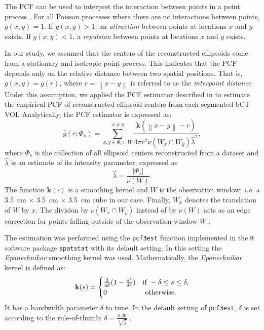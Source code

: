 \documentclass[journal]{IEEEtran}
\newcommand{\norm}[1]{\left\lVert#1\right\rVert}%
\begin{document}
The PCF can be used to interpret the interaction between points in a
point process \cite{illian2008statistical}. For all Poisson processes
where there are no interactions between points, $g(x,y)=1$. If
$g(x,y)>1$, an \textit{attraction} between points at locations $x$ and
$y$ exists. If $g(x,y)<1$, a \textit{repulsion} between points at
locations $x$ and $y$ exists.

In our study, we assumed that the centers of the reconstructed
ellipsoids come from a stationary and isotropic point process. This
indicates that the PCF depends only on the relative distance between
two spatial positions. That is, $g(x, y) = g(r)$, where
$r = \norm{x-y}$ is referred to as the \textit{interpoint
  distance}. Under this assumption, we applied the PCF estimator
described in \cite[p232]{illian2008statistical} to estimate the
empirical PCF of reconstructed ellipsoid centers from each segmented
bCT VOI. Analytically, the PCF estimator is expressed as:
\begin{equation}
  \label{eq:pcf-estimator}
  \hat{g}(r; \Phi_s) = \sum^{x \neq y}_{x, y \in \Phi_s \cap W}
  \frac{\mathbf{k}(\norm{x-y} - r)}
  {4 \pi r^2 \nu(W_x \cap W_y) \hat{\lambda}^2},
\end{equation}
where $\Phi_s$ is the collection of all ellipsoid centers
reconstructed from a dataset and $\hat{\lambda}$ is an estimate of its
intensity parameter, expressed as
\begin{equation}
  \label{eq:inten-estimtor}
  \hat{\lambda} = \frac{|\Phi_s|}{\nu(W)}.
\end{equation}
The function $\mathbf{k}(\cdot)$ is a smoothing kernel and $W$ is the
observation window; \textit{i.e.} a \SI{3.5}{\cm} $\times$
\SI{3.5}{\cm} $\times$ \SI{3.5}{\cm} cube in our case. Finally, $W_x$
denotes the translation of $W$ by $x$. The division by
$\nu(W_x \cap W_y)$ instead of by $\nu(W)$ acts as an edge correction
for points falling outside of the observation window $W$
\cite{ohser1983estimators}.

The estimation was performed using the \texttt{pcf3est} function
implemented in the \texttt{R} software package \texttt{spatstat}
\cite{baddeley2005spatstat} with its default setting. In this setting
the \textit{Epanechnikov} smoothing kernel \cite{chiu2013stochastic}
was used. Mathematically, the \textit{Epanechnikov} kernel is defined
as:
\begin{equation}
  \label{eq:epan-kernel}
  \mathbf{k}(s) =
  \begin{cases}
    \frac{3}{4\delta} (1 - \frac{s^2}{\delta^2}) & \textnormal{if }
    -\delta \leq s \leq \delta, \\
    0 & \textnormal{ otherwise}.
  \end{cases}
\end{equation}
It has a bandwidth parameter $\delta$ to tune. In the default setting
of \texttt{pcf3est}, $\delta$ is set according to the rule-of-thumb:
$\delta = \frac{0.26}{\sqrt[3]{\hat{\lambda}}}$
\cite{baddeley2005spatstat}.
\end{document}
